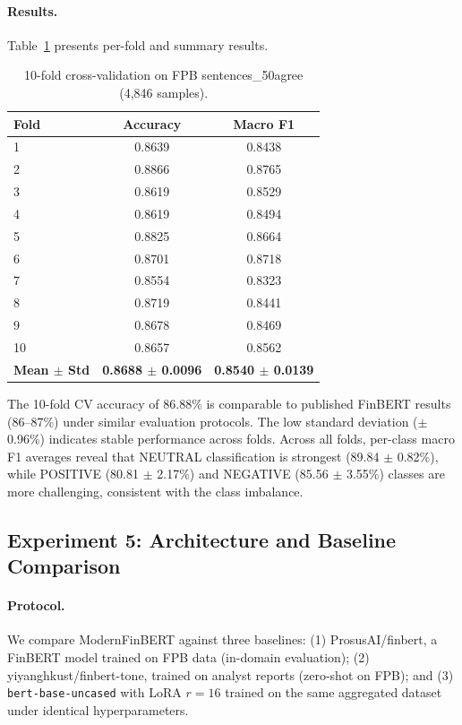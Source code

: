 \documentclass[11pt]{article}
\begin{document}
\paragraph{Results.}
Table~\ref{tab:kfold} presents per-fold and summary results.

\begin{table}[h]
\centering
\caption{10-fold cross-validation on FPB sentences\_50agree (4,846 samples).}
\label{tab:kfold}
\begin{tabular}{lcc}
\toprule
\textbf{Fold} & \textbf{Accuracy} & \textbf{Macro F1} \\
\midrule
1  & 0.8639 & 0.8438 \\
2  & 0.8866 & 0.8765 \\
3  & 0.8619 & 0.8529 \\
4  & 0.8619 & 0.8494 \\
5  & 0.8825 & 0.8664 \\
6  & 0.8701 & 0.8718 \\
7  & 0.8554 & 0.8323 \\
8  & 0.8719 & 0.8441 \\
9  & 0.8678 & 0.8469 \\
10 & 0.8657 & 0.8562 \\
\midrule
\textbf{Mean $\pm$ Std} & \textbf{0.8688 $\pm$ 0.0096} & \textbf{0.8540 $\pm$ 0.0139} \\
\bottomrule
\end{tabular}
\end{table}

The 10-fold CV accuracy of 86.88\% is comparable to published FinBERT results (86--87\%) under similar evaluation protocols. The low standard deviation ($\pm$0.96\%) indicates stable performance across folds. Across all folds, per-class macro F1 averages reveal that NEUTRAL classification is strongest (89.84 $\pm$ 0.82\%), while POSITIVE (80.81 $\pm$ 2.17\%) and NEGATIVE (85.56 $\pm$ 3.55\%) classes are more challenging, consistent with the class imbalance.

\subsection{Experiment 5: Architecture and Baseline Comparison}
\label{sec:baselines}

\paragraph{Protocol.}
We compare ModernFinBERT against three baselines: (1) ProsusAI/finbert, a FinBERT model trained on FPB data (in-domain evaluation); (2) yiyanghkust/finbert-tone, trained on analyst reports (zero-shot on FPB); and (3) \texttt{bert-base-uncased} with LoRA $r=16$ trained on the same aggregated dataset under identical hyperparameters.
\end{document}
